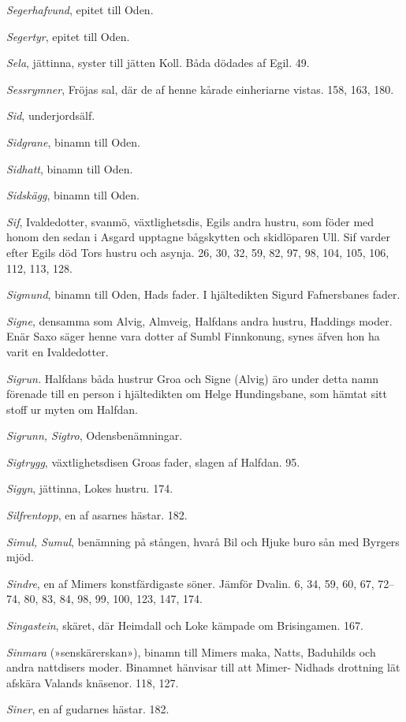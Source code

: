 \emph{Segerhafvund}, epitet till Oden.

\emph{Segertyr}, epitet till Oden.

\emph{Sela}, jättinna, syster till jätten Koll. Båda dödades af Egil.
49.

\emph{Sessrymner}, Fröjas sal, där de af henne kårade einheriarne
vistas. 158, 163, 180.

\emph{Sid}, underjordsälf.

\emph{Sidgrane}, binamn till Oden.

\emph{Sidhatt}, binamn till Oden.

\emph{Sidskägg}, binamn till Oden.

\emph{Sif}, Ivaldedotter, svanmö, växtlighetsdis, Egils andra hustru,
som föder med honom den sedan i Asgard upptagne bågskytten och
skidlöparen Ull. Sif varder efter Egils död Tors hustru och asynja. 26,
30, 32, 59, 82, 97, 98, 104, 105, 106, 112, 113, 128.

\emph{Sigmund}, binamn till Oden, Hads fader. I hjältedikten Sigurd
Fafnersbanes fader.

\emph{Signe}, densamma som Alvig, Almveig, Halfdans andra hustru,
Haddings moder. Enär Saxo säger henne vara dotter af Sumbl Finnkonung,
synes äfven hon ha varit en Ivaldedotter.

\emph{Sigrun.} Halfdans båda hustrur Groa och Signe (Alvig) äro under
detta namn förenade till en person i hjältedikten om Helge Hundingsbane,
som hämtat sitt stoff ur myten om Halfdan.

\emph{Sigrunn, Sigtro}, Odensbenämningar.

\emph{Sigtrygg}, växtlighetsdisen Groas fader, slagen af Halfdan. 95.

\emph{Sigyn}, jättinna, Lokes hustru. 174.

\emph{Silfrentopp}, en af asarnes hästar. 182.

\emph{Simul, Sumul}, benämning på stången, hvarå Bil och Hjuke buro sån
med Byrgers mjöd.

\emph{Sindre}, en af Mimers konstfärdigaste söner. Jämför Dvalin. 6, 34,
59, 60, 67, 72--74, 80, 83, 84, 98, 99, 100, 123, 147, 174.

\emph{Singastein}, skäret, där Heimdall och Loke kämpade om Brisingamen.
167.

\emph{Sinmara} (»senskärerskan»), binamn till Mimers maka, Natts,
Baduhilds och andra nattdisers moder. Binamnet hänvisar till att Mimer-
Nidhads drottning lät afskära Valands knäsenor. 118, 127.

\emph{Siner}, en af gudarnes hästar. 182.

